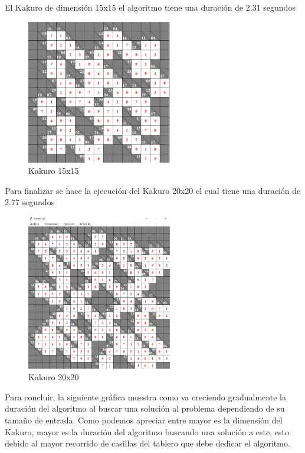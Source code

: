 \documentclass[journal]{IEEEtran}
\begin{document}
\begin{itemize}
	El Kakuro de dimensión 15x15 el algoritmo tiene una duración de 2.31 segundos
	
	\begin{figure}[h]
		\centering
		\includegraphics[width=180pt]{ExpKakuro15x15.png}
		\caption{Kakuro 15x15}
	\end{figure}
	
	Para finalizar se hace la ejecución del Kakuro 20x20 el cual tiene una duración de 2.77 segundos
	
	\begin{figure}[h]
		\centering
		\includegraphics[width=180pt]{ExpKakuro20x20.png}
		\caption{Kakuro 20x20}
	\end{figure}
	
	
	Para concluir, la siguiente gráfica muestra como va creciendo gradualmente la duración del algoritmo al buscar una solución al problema dependiendo de su tamaño de entrada. Como podemos apreciar entre mayor es la dimensión del Kakuro, mayor es la duración del algoritmo buscando una solución a este, esto debido al mayor recorrido de casillas del tablero que debe dedicar el algoritmo.
	

\end{itemize}
\end{document}

